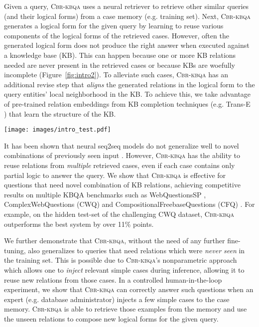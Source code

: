\documentclass[11pt]{article}
\newcommand{\alg}{\textsc{Cbr-kbqa}\xspace}
\begin{document}
Given a query, \alg uses a neural retriever to retrieve other similar queries (and their logical forms) from a case memory (e.g. training set). Next, \alg generates a logical form for the given query by learning to reuse various components of the logical forms of the retrieved cases. However, often the generated logical form does not produce the right answer when executed against a knowledge base (KB). This can happen because one or more KB relations needed are never present in the retrieved cases or because KBs are woefully incomplete \cite{min2013distant} (Figure~\ref{fig:intro2}). To alleviate such cases, \alg has an additional revise step that \emph{aligns} the generated relations in the logical form to the query entities' local neighborhood in the KB. To achieve this, we take advantage of pre-trained relation embeddings from KB completion techniques (e.g. Trans-E \cite{bordes2013translating}) that learn the structure of the KB.

\begin{figure*}
    \centering
    \texttt{[image: images/intro\_test.pdf]}
    \vspace{-1mm}
    \caption{\alg derives the logical form (LF) for a new query from the LFs of other retrieved queries from the case-memory. However, the derived LF might not execute because of missing edges in the KB. The revise step aligns any such missing edges (relations) with existing semantically-similar edges in the KB.}
    \label{fig:intro2}
\end{figure*}


It has been shown that neural seq2seq models do not generalize well to novel combinations of previously seen input \cite{lake_baroni,loula2018rearranging}. However, \alg has the ability to reuse relations from \emph{multiple} retrieved cases, even if each case contains only partial logic to answer the query. We show that \alg is effective for questions that need novel combination of KB relations, achieving competitive results on multiple KBQA benchmarks such as  WebQuestionsSP \cite{yih2016value}, ComplexWebQuestions (CWQ) \cite{Talmor2018TheWA} and CompositionalFreebaseQuestions (CFQ) \cite{keysers2020measuring}. For example, on the hidden test-set of the challenging CWQ dataset, \alg outperforms the best system by over 11\% points.

 We further demonstrate that \alg, without the need of any further fine-tuning, also generalizes to queries that need relations which were \emph{never seen} in the training set. This is possible due to \alg's nonparametric approach which allows one to \emph{inject} relevant simple cases during inference, allowing it to reuse new relations from those cases. In a controlled human-in-the-loop experiment, we show that \alg can correctly answer such questions when an expert (e.g. database administrator) injects a few simple cases to the case memory. \alg is able to retrieve those examples from the memory and use the unseen relations to compose new logical forms for the given query.
 
\end{document}
